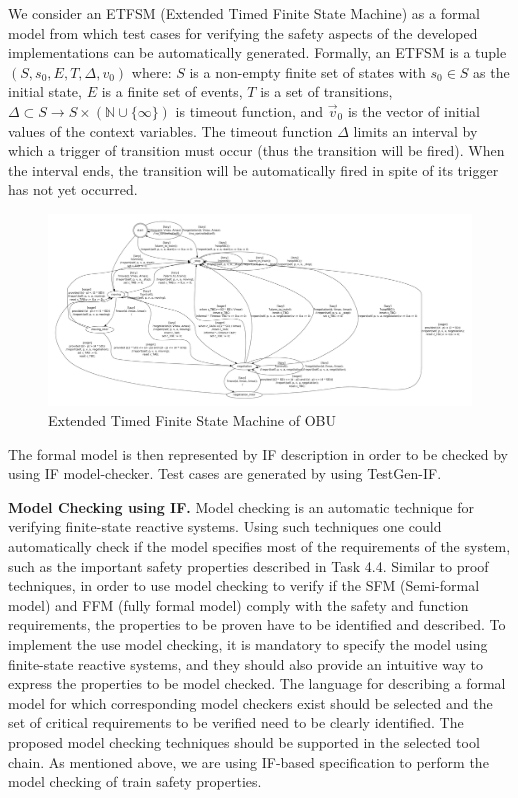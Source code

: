 \documentclass{template/openetcs_article}
\begin{document}
We consider an ETFSM (Extended Timed Finite State Machine) as a formal model
from which test cases for verifying the safety aspects of the developed
implementations can be automatically generated.
Formally, 
    an ETFSM is a tuple 
    $(S, s_0, E, T,  \Delta, v_0)$ where:
    $S$ is a non-empty finite set of states with $s_0 \in S$ as the
        initial state,
 $E$ is a finite set of events,
 $T$ is a set of transitions, 
 $\Delta \subset S \to S \times (\mathbb{N} \cup \{ \infty \})$ is timeout function, and
 $\vec{v}_0$ is the vector of initial values of the context variables.
The timeout function $\Delta$ limits an interval by which a trigger of
transition must occur (thus the transition will be fired). 
When the interval ends, the transition will be automatically fired in spite of
its trigger has not yet occurred.


\begin{figure}[!htbp]
\begin{center}
  \includegraphics[width=24.5cm, angle=90]{figures/if-model.pdf}
  \caption{Extended Timed Finite State Machine of OBU}
  \label{fig:model}
\end{center}
\end{figure}



The formal model is then represented by IF description%
in order to be checked by using IF model-checker.
Test cases are generated by using TestGen-IF.

\textbf{Model Checking using IF.}
Model checking is an automatic technique for verifying finite-state reactive
systems. Using such techniques one could automatically check if the model
specifies most of the requirements of the system, such as the important safety
properties described in Task 4.4. Similar to proof techniques, in order to use
model checking to verify if the SFM (Semi-formal model) and FFM (fully formal
model) comply with the safety and function requirements,
the properties to be proven have to be identified and described. To implement
the use model checking, it is mandatory to specify the model using finite-state
reactive systems, and they should also provide an intuitive way to express the
properties to be model checked. The language for describing a formal model for
which corresponding model checkers exist should be selected and the set of
critical requirements to be verified need to be clearly identified. The proposed
model checking techniques should be supported in the selected tool chain. As
mentioned above, we are using IF-based specification to perform
the model checking of train safety properties.
\end{document}
